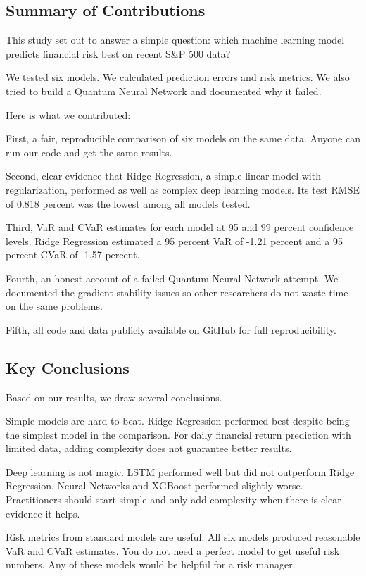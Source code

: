 \documentclass[12pt,a4paper]{article}
\begin{document}
\subsection{Summary of Contributions}
This study set out to answer a simple question: which machine learning model predicts financial risk best on recent S\&P 500 data?

We tested six models. We calculated prediction errors and risk metrics. We also tried to build a Quantum Neural Network and documented why it failed.

Here is what we contributed:

First, a fair, reproducible comparison of six models on the same data. Anyone can run our code and get the same results.

Second, clear evidence that Ridge Regression, a simple linear model with regularization, performed as well as complex deep learning models. Its test RMSE of 0.818 percent was the lowest among all models tested.

Third, VaR and CVaR estimates for each model at 95 and 99 percent confidence levels. Ridge Regression estimated a 95 percent VaR of -1.21 percent and a 95 percent CVaR of -1.57 percent.

Fourth, an honest account of a failed Quantum Neural Network attempt. We documented the gradient stability issues so other researchers do not waste time on the same problems.

Fifth, all code and data publicly available on GitHub for full reproducibility.

\subsection{Key Conclusions}
Based on our results, we draw several conclusions.

Simple models are hard to beat. Ridge Regression performed best despite being the simplest model in the comparison. For daily financial return prediction with limited data, adding complexity does not guarantee better results.

Deep learning is not magic. LSTM performed well but did not outperform Ridge Regression. Neural Networks and XGBoost performed slightly worse. Practitioners should start simple and only add complexity when there is clear evidence it helps.

Risk metrics from standard models are useful. All six models produced reasonable VaR and CVaR estimates. You do not need a perfect model to get useful risk numbers. Any of these models would be helpful for a risk manager.
\end{document}
